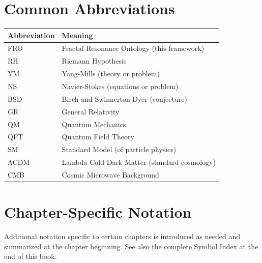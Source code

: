 \section*{Common Abbreviations}

\begin{center}
\begin{tabular}{ll}
\toprule
\textbf{Abbreviation} & \textbf{Meaning} \\
\midrule
FRO & Fractal Resonance Ontology (this framework) \\
RH & Riemann Hypothesis \\
YM & Yang-Mills (theory or problem) \\
NS & Navier-Stokes (equations or problem) \\
BSD & Birch and Swinnerton-Dyer (conjecture) \\
GR & General Relativity \\
QM & Quantum Mechanics \\
QFT & Quantum Field Theory \\
SM & Standard Model (of particle physics) \\
ΛCDM & Lambda Cold Dark Matter (standard cosmology) \\
CMB & Cosmic Microwave Background \\
\bottomrule
\end{tabular}
\end{center}

\section*{Chapter-Specific Notation}

Additional notation specific to certain chapters is introduced as needed and summarized at the chapter beginning. See also the complete Symbol Index at the end of this book.
